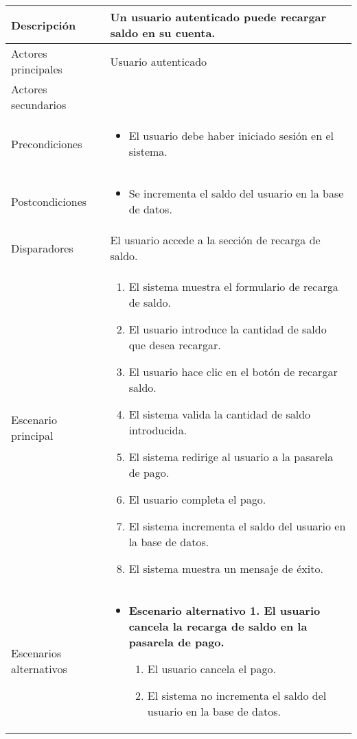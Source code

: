 \begin{longtable}{
    >{\columncolor{lightgreen!20}}p{4cm}
    p{12cm}
    }
    \midrule
    Descripción & Un usuario autenticado puede recargar saldo en su cuenta. \\
    \midrule
    Actores principales & Usuario autenticado \\
    \midrule
    Actores secundarios &  \\
    \midrule
    Precondiciones & \begin{itemize}[nosep,leftmargin=*]
        \item El usuario debe haber iniciado sesión en el sistema.
    \end{itemize} \\
    \midrule
    Postcondiciones & \begin{itemize}[nosep,leftmargin=*]
        \item Se incrementa el saldo del usuario en la base de datos.
    \end{itemize} \\
    \midrule
    Disparadores & El usuario accede a la sección de recarga de saldo. \\
    \midrule
    Escenario principal & \begin{enumerate}[nosep,leftmargin=*]
        \item El sistema muestra el formulario de recarga de saldo.
        \item El usuario introduce la cantidad de saldo que desea recargar.
        \item El usuario hace clic en el botón de recargar saldo.
        \item El sistema valida la cantidad de saldo introducida.
        \item El sistema redirige al usuario a la pasarela de pago.
        \item El usuario completa el pago.
        \item El sistema incrementa el saldo del usuario en la base de datos.
        \item El sistema muestra un mensaje de éxito.
    \end{enumerate} \\
    \midrule
    Escenarios alternativos & 
    \begin{itemize}[nosep,leftmargin=*]
        \item \textbf{Escenario alternativo 1. El usuario cancela la recarga de saldo en la pasarela de pago.}
        \begin{enumerate}[nosep,leftmargin=*]
            \item El usuario cancela el pago.
            \item El sistema no incrementa el saldo del usuario en la base de datos.

\end{enumerate}
\end{itemize}
\end{longtable}
